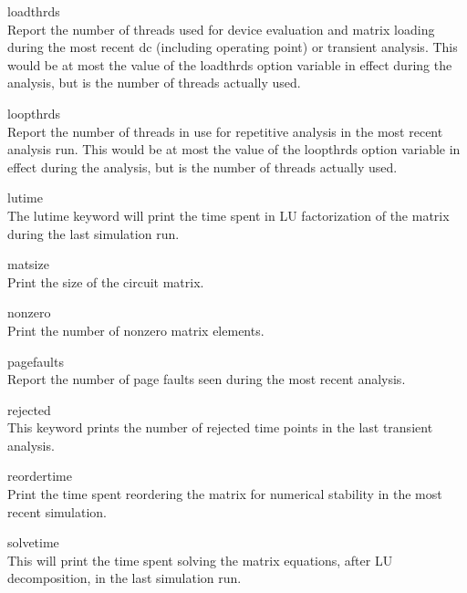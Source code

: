 \begin{description}
\item{\vt loadthrds}\\
Report the number of threads used for device evaluation and matrix
loading during the most recent dc (including operating point) or
transient analysis.  This would be at most the value of the {\et
loadthrds} option variable in effect during the analysis, but is the
number of threads actually used.

\item{\vt loopthrds}\\
Report the number of threads in use for repetitive analysis in the
most recent analysis run.  This would be at most the value of the {\et
loopthrds} option variable in effect during the analysis, but is the
number of threads actually used.

\item{\vt lutime}\\
The {\vt lutime} keyword will print the time spent in LU factorization
of the matrix during the last simulation run.

\item{\vt matsize}\\
Print the size of the circuit matrix.

\item{\vt nonzero}\\
Print the number of nonzero matrix elements.

\item{\vt pagefaults}\\
Report the number of page faults seen during the most recent analysis.

\item{\vt rejected}\\
This keyword prints the number of rejected time points in the last
transient analysis.

\item{\vt reordertime}\\
Print the time spent reordering the matrix for numerical stability in
the most recent simulation.

\item{\vt solvetime}\\
This will print the time spent solving the matrix equations, after
LU decomposition, in the last simulation run.


\end{description}
